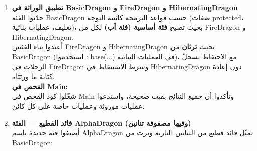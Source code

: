 \documentclass[14pt]{extarticle}
\begin{document}
\begin{enumerate}[resume, label=\textbf{تمرين \arabic*:}, wide=0pt, leftmargin=*, itemsep=2.2em]

    \item \textbf{تطبيق الوراثة في \textenglish{BasicDragon} و \textenglish{FireDragon} و \textenglish{HibernatingDragon}} \\
    حدّثوا الفئة \textenglish{BasicDragon} حسب قواعد البرمجة كائنية التوجه (صفات \textenglish{protected}، تغليف، عمليات بنائية)، بحيث تصبح \textbf{فئة أساسية (فئة أب)} لكل من \textenglish{FireDragon} و \textenglish{HibernatingDragon}. \\
    أعيدوا بناء الفئتين \textenglish{FireDragon} و \textenglish{HibernatingDragon} بحيث \textbf{ترثان} من \textenglish{BasicDragon} (استخدموا \textenglish{: base(...)} في العمليات البنائية)، مع الاحتفاظ بسجلّ الرحلات في \textenglish{FireDragon} وشرط الاستيقاظ في \textenglish{HibernatingDragon} دون إعادة كتابة ما ورثتاه. \\
    \textbf{الفحص في \textenglish{Main}:} \\
    شغّلوا كود الفحص في \textenglish{Main} وتأكدوا أن جميع النتائج بقيت صحيحة، واستدعوا عمليات موروثة وعمليات خاصة على كل كائن.

    \item \textbf{قائد القطيع — الفئة \textenglish{AlphaDragon} (وفيها مصفوفة تنانين)} \\
    أضيفوا فئة جديدة باسم \textenglish{AlphaDragon} تمثّل قائد قطيع من التنانين النارية وترث من \textenglish{BasicDragon}:


\end{enumerate}
\end{document}
